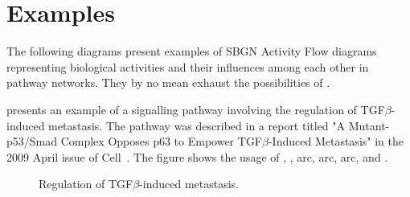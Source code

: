 
\chapter{Examples}
\label{af:example}


The following diagrams present examples of SBGN Activity Flow diagrams representing biological activities and their influences among each other in pathway networks.  They by no mean exhaust the possibilities of \SBGNAFLone.

 presents an example of a signalling pathway involving the regulation of TGF$\beta$-induced metastasis.  The pathway was described in a report titled "A Mutant-p53/Smad Complex Opposes p63 to Empower TGF$\beta$-Induced Metastasis" in the 2009 April issue of Cell~\cite{Adorno:2009}.  The figure shows the usage of , ,  arc,  arc,  arc, and .

\begin{figure}
\begin{center}
\caption{Regulation of TGF$\beta$-induced metastasis.}\label{fig:TGF}
\end{center}
\end{figure}

